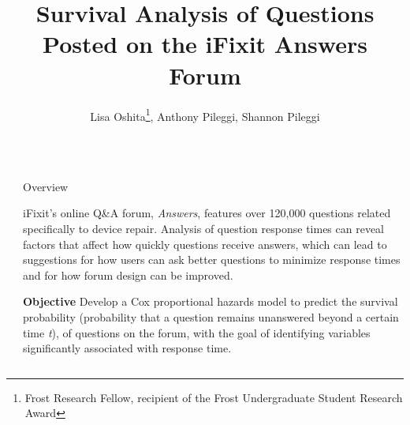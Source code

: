 \documentclass[final]{beamer}
\title{Survival Analysis of Questions Posted on the iFixit Answers Forum} %
\author{Lisa Oshita\footnote{Frost Research Fellow, recipient of the Frost Undergraduate Student Research Award}, Anthony Pileggi, Shannon Pileggi} %
\institute{Department of Statistics, California Polytechnic State University} %
\newlength{\sepwid}
\newlength{\onecolwid}
\begin{document}

\setlength{\belowcaptionskip}{0ex} %
\setlength\belowdisplayshortskip{2ex} %

\begin{frame}[t] %

\begin{columns}[t] %

\begin{column}{\sepwid}\end{column} %

\begin{column}{\onecolwid} %


\begin{alertblock}{Overview}

\vspace{0.5ex}

iFixit's online Q\&A forum, \textit{Answers}, features over 120,000 questions related specifically to device repair. Analysis of question response times can reveal factors that affect how quickly questions receive answers, which can lead to suggestions for how users can ask better questions to minimize response times and for how forum design can be improved. 

\vspace{2ex}

\textcolor{dblue!70}{} \textcolor{dblue!70}{\textbf{Objective}} Develop a Cox proportional hazards model to predict the survival probability (probability that a question remains unanswered beyond a certain time \textit{t}), of questions on the forum, with the goal of identifying variables significantly associated with response time.

\vspace{0.5ex}


\end{alertblock}
\end{column}
\end{columns}
\end{frame}
\end{document}
